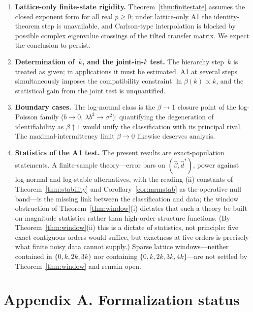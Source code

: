 \documentclass[pdflatex,sn-mathphys-num]{sn-jnl}
\theoremstyle{thmstyleone}
\theoremstyle{thmstyletwo}
\theoremstyle{thmstylethree}
\begin{document}
\begin{enumerate}
\item \textbf{Lattice-only finite-state rigidity.}
  Theorem~\ref{thm:finitestate} assumes the closed exponent form for
  all real $p \ge 0$; under lattice-only A1 the identity-theorem
  step is unavailable, and Carlson-type interpolation is blocked by
  possible complex eigenvalue crossings of the tilted transfer
  matrix.  We expect the conclusion to persist.

\item \textbf{Determination of~$k$, and the joint-in-$k$ test.}
  The hierarchy step~$k$ is treated as given; in applications it
  must be estimated.  A1 at several steps simultaneously imposes the
  compatibility constraint $\ln\beta(k) \propto k$, and the
  statistical gain from the joint test is unquantified.

\item \textbf{Boundary cases.}  The log-normal class is the $\beta
  \to 1$ closure point of the log-Poisson family ($b \to 0$,
  $\lambda b^2 \to \sigma^2$): quantifying the degeneration of
  identifiability as $\beta \uparrow 1$ would unify the
  classification with its principal rival.  The maximal-intermittency
  limit $\beta \to 0$ likewise deserves analysis.

\item \textbf{Statistics of the A1 test.}  The present results are
  exact-population statements.  A finite-sample theory---error bars
  on $(\hat\beta, \hat d^*)$, power against log-normal and
  log-stable alternatives, with the reading-(ii) constants of
  Theorem~\ref{thm:stability} and Corollary~\ref{cor:mrmstab} as the
  operative null band---is the missing link between the
  classification and data; the window obstruction of
  Theorem~\ref{thm:window}(i) dictates that such a theory be built
  on magnitude statistics rather than high-order structure
  functions.  (By Theorem~\ref{thm:window}(ii) this is a dictate of
  statistics, not principle: five exact contiguous orders would
  suffice, but exactness at five orders is precisely what finite
  noisy data cannot supply.)  Sparse lattice windows---neither
  contained in $\{0, k, 2k, 3k\}$ nor containing
  $\{0, k, 2k, 3k, 4k\}$---are not settled by
  Theorem~\ref{thm:window} and remain open.
\end{enumerate}

\section*{Appendix A. Formalization status}
\end{document}
